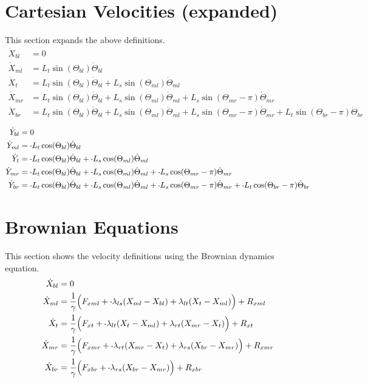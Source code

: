 \documentclass[11pt, landscape]{article}
\newcommand{\mn}{\scalebox{0.7}[1.0]{-}}
\begin{document}
\section{Cartesian Velocities (expanded)}
This section expands the above definitions. \\
\begin{align}
  \dot{X}_{bl} &= 0 \\
  \dot{X}_{ml} &= L_{t}\sin(\Theta_{bl})\dot{\Theta}_{bl} \\
  \dot{X}_{t } &= L_{t}\sin(\Theta_{bl})\dot{\Theta}_{bl} + L_{s}\sin(\Theta_{ml})\dot{\Theta}_{ml} \\
  \dot{X}_{mr} &= L_{t}\sin(\Theta_{bl})\dot{\Theta}_{bl} + L_{s}\sin(\Theta_{ml})\dot{\Theta}_{ml} + L_{s}\sin(\Theta_{mr}-\pi)\dot{\Theta}_{mr} \\
  \dot{X}_{br} &= L_{t}\sin(\Theta_{bl})\dot{\Theta}_{bl} + L_{s}\sin(\Theta_{ml})\dot{\Theta}_{ml} + L_{s}\sin(\Theta_{mr}-\pi)\dot{\Theta}_{mr} + L_{t}\sin(\Theta_{br}-\pi)\dot{\Theta}_{br}
\end{align}             
             
\begin{align}                                                                               
  \dot{Y}_{bl} &= 0 \\                                                               
  \dot{Y}_{ml} &= \mn L_{t}\cos(\Theta_{bl})\dot{\Theta}_{bl} \\
  \dot{Y}_{t}  &= \mn L_{t}\cos(\Theta_{bl})\dot{\Theta}_{bl} + \mn L_{s}\cos(\Theta_{ml})\dot{\Theta}_{ml} \\
  \dot{Y}_{mr} &= \mn L_{t}\cos(\Theta_{bl})\dot{\Theta}_{bl} + \mn L_{s}\cos(\Theta_{ml})\dot{\Theta}_{ml} + \mn L_{s}\cos(\Theta_{mr}-\pi)\dot{\Theta}_{mr} \\
  \dot{Y}_{br} &= \mn L_{t}\cos(\Theta_{bl})\dot{\Theta}_{bl} + \mn L_{s}\cos(\Theta_{ml})\dot{\Theta}_{ml} + \mn L_{s}\cos(\Theta_{mr}-\pi)\dot{\Theta}_{mr} + \mn L_{t}\cos(\Theta_{br}-\pi)\dot{\Theta}_{br}
\end{align}


\section{Brownian Equations}
This section shows the velocity definitions using the Brownian dynamics equation. \\
\begin{align}  
  \dot{X}_{bl} &= 0 \\
  \dot{X}_{ml} &= \frac{1}{\gamma} \Big(F_{xml} + \mn \lambda_{ls}(X_{ml} - X_{bl}) + \lambda_{lt}(X_{t } - X_{ml}) \Big) + R_{xml} \\
  \dot{X}_{t } &= \frac{1}{\gamma} \Big(F_{xt } + \mn \lambda_{lt}(X_{t } - X_{ml}) + \lambda_{rt}(X_{mr} - X_{t }) \Big) + R_{xt } \\
  \dot{X}_{mr} &= \frac{1}{\gamma} \Big(F_{xmr} + \mn \lambda_{rt}(X_{mr} - X_{t }) + \lambda_{rs}(X_{br} - X_{mr}) \Big) + R_{xmr} \\
  \dot{X}_{br} &= \frac{1}{\gamma} \Big(F_{xbr} + \mn \lambda_{rs}(X_{br} - X_{mr})                                 \Big) + R_{xbr}
\end{align}
\end{document}
